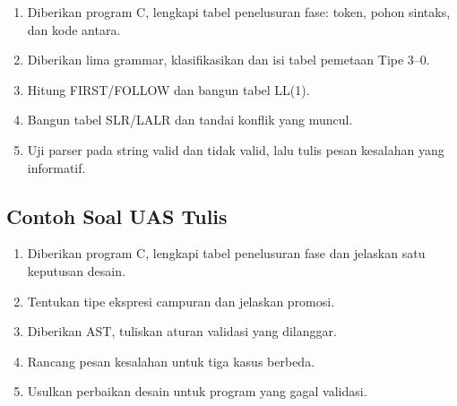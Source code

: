 \begin{enumerate}[label=\arabic*.,leftmargin=*]
  \item Diberikan program C, lengkapi tabel penelusuran fase: token,
        pohon sintaks, dan kode antara.
  \item Diberikan lima grammar, klasifikasikan dan isi tabel pemetaan
        Tipe 3--0.
  \item Hitung FIRST/FOLLOW dan bangun tabel LL(1).
  \item Bangun tabel SLR/LALR dan tandai konflik yang muncul.
  \item Uji parser pada string valid dan tidak valid, lalu tulis pesan
        kesalahan yang informatif.
\end{enumerate}

\subsection{Contoh Soal UAS Tulis}

\begin{enumerate}[label=\arabic*.,leftmargin=*]
  \item Diberikan program C, lengkapi tabel penelusuran fase dan
        jelaskan satu keputusan desain.
  \item Tentukan tipe ekspresi campuran dan jelaskan promosi.
  \item Diberikan AST, tuliskan aturan validasi yang dilanggar.
  \item Rancang pesan kesalahan untuk tiga kasus berbeda.
  \item Usulkan perbaikan desain untuk program yang gagal validasi.
\end{enumerate}
